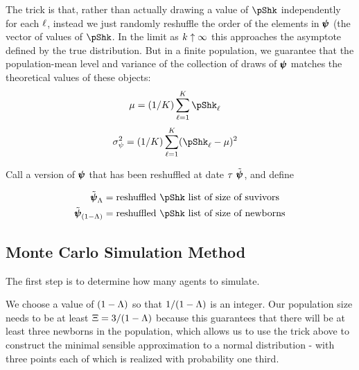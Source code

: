 \documentclass[\econtexRoot/BufferStockTheory.tex]{subfiles}
\begin{document}
The trick is that, rather than actually drawing a value of $\pShk$ independently for each $\ell$, instead we just randomly reshuffle the order of the elements in $\pmb{\psi}$ (the vector of values of $\pShk$.  In the limit as $k \uparrow \infty$ this approaches the asymptote defined by the true distribution.  But in a finite population, we guarantee that the population-mean level and variance of the collection of draws of $\pmb{\psi}$ matches the theoretical values of these objects:
\begin{equation}\begin{gathered}\begin{aligned}
  \mu & = (1/\Mass)\sum_{\posn=1}^{\Mass}\pShk_{\posn}
\end{aligned}\end{gathered}\end{equation}
\begin{equation}\begin{gathered}\begin{aligned}
  \sigma^{2}_{\DnsShk} & = (1/\Mass)\sum_{\posn=1}^{\Mass}(\pShk_{\posn} - \mu)^{2}
\end{aligned}\end{gathered}\end{equation}

Call a version of $\pmb{\psi}$ that has been reshuffled at date $\tau$ $\tilde{\pmb{\psi}}$, and define

\newcommand{\pShkOldRemix}{\tilde{\vctr{\DnsShk}}_{\Liv}}
\newcommand{\pShkNewRemix}{\tilde{\vctr{\DnsShk}}_{\Die}}
\begin{equation}\begin{gathered}\begin{aligned}
  \pShkOldRemix & = \text{reshuffled $\pShk$ list of size of suvivors} 
  \\  \pShkNewRemix & = \text{reshuffled $\pShk$ list of size of newborns}
\end{aligned}\end{gathered}\end{equation}

\subsection{Monte Carlo Simulation Method}

The first step is to determine how many agents to simulate.

\newcommand{\popMult}{\Xi}

We choose a value of $(1-\Lambda)$ so that $1/(1-\Lambda)$ is an integer.  Our population size needs to be at least $\popMult = 3/\Die$ because this guarantees that there will be at least three newborns in the population, which allows us to use the trick above to construct the minimal sensible approximation to a normal distribution - with three points each of which is realized with probability one third.
\end{document}
